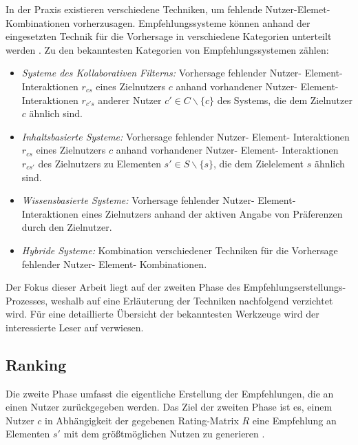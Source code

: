 In der Praxis existieren verschiedene Techniken, um fehlende Nutzer-Elemet-Kombinationen vorherzusagen.
Empfehlungssysteme können anhand der eingesetzten Technik für die Vorhersage in verschiedene Kategorien unterteilt werden \cite[S. 8 ff.]{recommenderSystems:2016}.
Zu den bekanntesten Kategorien von Empfehlungssystemen zählen:
\begin{itemize}%
	\item \textit{Systeme des Kollaborativen Filterns:} Vorhersage fehlender Nutzer- Element- Interaktionen $r_{cs}$ eines Zielnutzers $c$ anhand vorhandener Nutzer- Element- Interaktionen $r_{c's}$ anderer Nutzer $c' \in C \backslash \{c\}$ des Systems, die dem Zielnutzer $c$ ähnlich sind.
	\item \textit{Inhaltsbasierte Systeme:} Vorhersage fehlender Nutzer- Element- Interaktionen $r_{cs}$ eines Zielnutzers $c$ anhand vorhandener Nutzer- Element- Interaktionen $r_{cs'}$ des Zielnutzers zu Elementen $s' \in S \backslash \{s\}$, die dem Zielelement $s$ ähnlich sind.
	\item \textit{Wissensbasierte Systeme:} Vorhersage fehlender Nutzer- Element- Interaktionen eines Zielnutzers anhand der aktiven Angabe von Präferenzen durch den Zielnutzer.
	\item \textit{Hybride Systeme:} Kombination verschiedener Techniken für die Vorhersage fehlender Nutzer- Element- Kombinationen.
\end{itemize}

Der Fokus dieser Arbeit liegt auf der zweiten Phase des Empfehlungserstellungs-Prozesses, weshalb auf eine Erläuterung der Techniken nachfolgend verzichtet wird.
Für eine detaillierte Übersicht der bekanntesten Werkzeuge wird der interessierte Leser auf \textcite[S. 8ff.]{recommenderSystems:2016} verwiesen.

\subsection{Ranking}
\label{ch:empfehlungssysteme:empfehlungserstellung:recommendation}
Die zweite Phase umfasst die eigentliche Erstellung der Empfehlungen, die an einen Nutzer zurückgegeben werden.
Das Ziel der zweiten Phase ist es, einem Nutzer $c$ in Abhängigkeit der gegebenen Rating-Matrix $R$ eine Empfehlung an Elementen $s'$ mit dem größtmöglichen Nutzen zu generieren \cite[S. 6]{ekstrand:article}.

